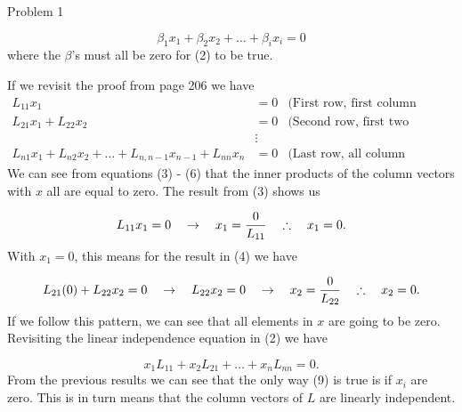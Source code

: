 \begin{problem}{Problem 1}
\begin{Highlight}[Solution]
        \begin{equation}
            \beta_{1}x_{1} + \beta_{2}x_{2} + \dots + \beta_{i}x_{i} = 0
        \end{equation}
        where the $\beta$'s must all be zero for (2) to be true.

        If we revisit the proof from page 206 we have
        \begin{align}
            L_{11}x_{1} & = 0 & \text{(First row, first column element)} \\
            L_{21}x_{1} + L_{22}x_{2} & = 0 & \text{(Second row, first two column elements)} \\
            & \vdots & \\
            L_{n1}x_{1} + L_{n2}x_{2} + \dots + L_{n,n-1}x_{n-1} + L_{nn}x_{n} & = 0 & \text{(Last row, all column elements.)}
        \end{align}
        We can see from equations (3) - (6) that the inner products of the column vectors with $x$ all are equal to zero. The result from (3) shows us

        \begin{equation}
            L_{11}x_{1} = 0 \hspace*{10pt} \rightarrow \hspace*{10pt} x_{1} = \frac{0}{L_{11}} \hspace*{10pt} \therefore \hspace*{10pt} x_{1} = 0.
        \end{equation}
        With $x_{1} = 0$, this means for the result in (4) we have 

        \begin{equation}
            L_{21}(0) + L_{22}x_{2} = 0 \hspace*{10pt} \rightarrow \hspace*{10pt} L_{22}x_{2} = 0 \hspace*{10pt} \rightarrow \hspace*{10pt} x_{2} = \frac{0}{L_{22}} \hspace*{10pt} \therefore \hspace*{10pt} x_{2} = 0.
        \end{equation}
        If we follow this pattern, we can see that all elements in $x$ are going to be zero. Revisiting the linear independence equation in (2) we have 

        \begin{equation}
            x_{1}L_{11} + x_{2}L_{21} + \dots + x_{n}L_{nn} = 0.
        \end{equation}
        From the previous results we can see that the only way (9) is true is if $x_{i}$ are zero. This is in turn means that the column vectors of $L$ are linearly independent.


\end{Highlight}
\end{problem}
